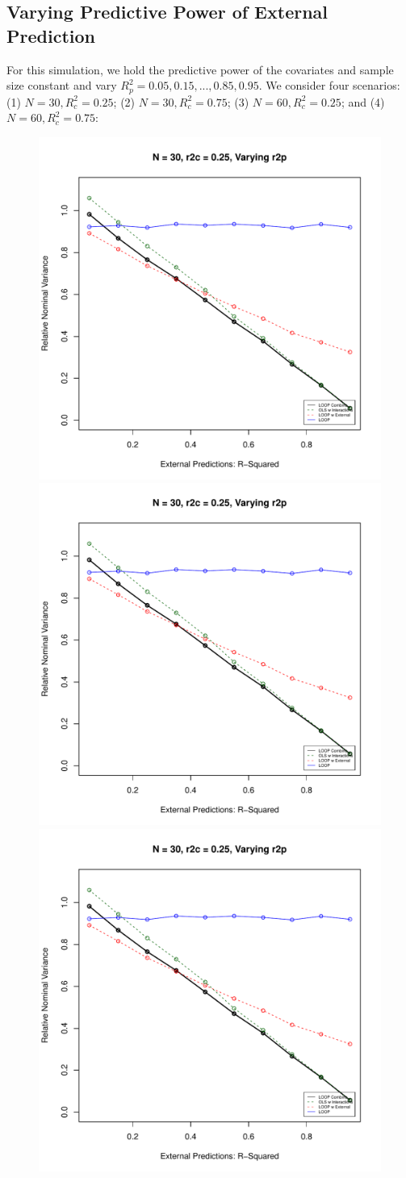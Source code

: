 \subsection{Varying Predictive Power of External Prediction}
For this simulation, we hold the predictive power of the covariates and sample size constant and vary $R^2_p = 0.05, 0.15, ..., 0.85, 0.95$. We consider four scenarios: (1) $N = 30, R^2_c = 0.25$; (2) $N = 30, R^2_c = 0.75$; (3) $N = 60, R^2_c = 0.25$; and (4) $N = 60, R^2_c = 0.75$:
\begin{figure}[H]
	\centering
	\includegraphics[width=.49\linewidth]{images/r2p.pdf}
	\includegraphics[width=.49\linewidth,page = 2]{images/r2p.pdf} \quad
	\smallskip
	\includegraphics[width=.49\linewidth,page = 3]{images/r2p.pdf}

\end{figure}
